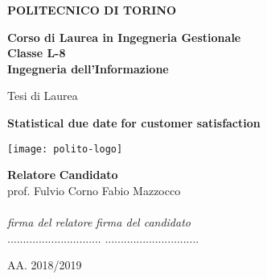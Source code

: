 \begin{titlepage}
   \begin{center}
       \begin{huge}
       \textbf{POLITECNICO DI TORINO}
       \end{huge}
 
       \vspace{1.1cm}
       \textbf{Corso di Laurea in Ingegneria Gestionale\\Classe L-8\\ Ingegneria dell'Informazione}
 
       \vspace{1.5cm}
 
       \begin{Large}
       Tesi di Laurea\\
       \end{Large}
 	
       \vspace{0.5cm}

       \begin{LARGE}
       \textbf{Statistical due date}
       \vspace{0.2cm}
       \textbf{for customer satisfaction}
       \end{LARGE}

       \vspace{1.3cm}
       \texttt{[image: polito-logo]}
      \vspace{2cm}
   \end{center}
   \textbf{Relatore} \hfill \textbf{Candidato}\\
   prof. Fulvio Corno \hfill Fabio Mazzocco\\ \\
   \textit{firma del relatore} \hfill \textit{firma del candidato}\\
   .............................. \hfill ..............................

  \vfill
  \begin{center}
	AA. 2018/2019
  \end{center}

\end{titlepage}